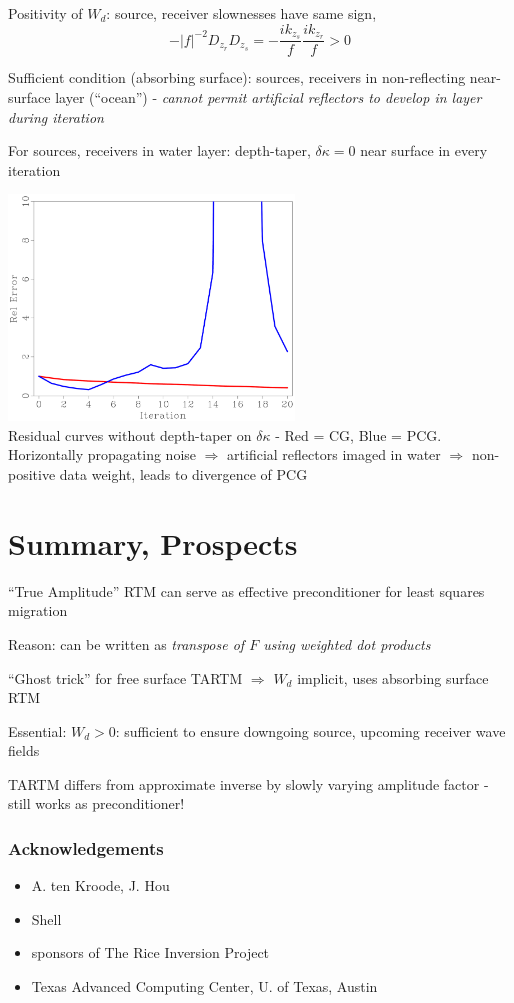 \documentclass[xcolor=dvipsnames,12pt,aspectratio=169]{beamer}
\begin{document}
\begin{frame}
Positivity of $W_d$:  source, receiver slownesses have same sign,
\[
-|f|^{-2}D_{z_r}D_{z_s} = -\frac{ik_{z_s}}{f}\frac{ik_{z_r}}{f} > 0
\]

Sufficient condition (absorbing surface): sources, receivers in non-reflecting near-surface layer (``ocean'') - {\em cannot permit artificial reflectors to develop in layer during iteration}

For sources, receivers in water layer: depth-taper, $\delta \kappa = 0$ near surface in every iteration
\end{frame}

\begin{frame}
\vspace{-0.5cm}
\begin{center}
\includegraphics[height=6cm]{Fig/fine1compnt}\\
Residual curves without depth-taper on $\delta \kappa$ - Red = CG, Blue = PCG. Horizontally propagating noise $\Rightarrow$ artificial reflectors imaged in water $\Rightarrow$ non-positive data weight, leads to divergence of PCG
\end{center}
\end{frame}

\section{Summary, Prospects}

\begin{frame}
``True Amplitude'' RTM can serve as effective preconditioner for least squares migration

Reason: can be written as {\em transpose of $F$ using weighted dot products}

``Ghost trick'' for free surface TARTM $\Rightarrow$ $W_d$ implicit, uses absorbing surface RTM

Essential: $W_d > 0$: sufficient to ensure downgoing source, upcoming receiver wave fields

TARTM differs from approximate inverse by slowly varying amplitude factor - still works as preconditioner!
\end{frame}

\begin{frame}\frametitle{Acknowledgements}
\begin{itemize}
\item A. ten Kroode, J. Hou
\item Shell 
\item sponsors of The Rice Inversion Project
\item Texas Advanced Computing Center, U. of Texas, Austin
\end{itemize}
\end{frame}
\end{document}
